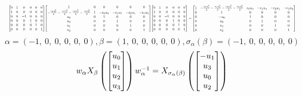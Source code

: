 \documentclass[11pt]{article}
\theoremstyle{definition}
\begin{document}
\[
\scaletoalign{\textwidth}{{\left[\begin{matrix}0 & 1 & 0 & 0 & 0 & 0\\1 & 0 & 0 & 0 & 0 & 0\\0 & 0 & -1 & 0 & 0 & 0\\0 & 0 & 0 & 1 & 0 & 0\\0 & 0 & 0 & 0 & 1 & 0\\0 & 0 & 0 & 0 & 0 & 1\end{matrix}\right]} {\left[\begin{matrix}1 & 0 & 0 & 0 & 0 & 0\\- \frac{c_{0} u_{0}^{2}}{2} - \frac{c_{1} u_{3}^{2}}{2} - \frac{c_{2} u_{1}^{2}}{2} - \frac{c_{3} u_{2}^{2}}{2} & 1 & - c_{0} u_{0} & - c_{1} u_{3} & - c_{2} u_{1} & - c_{3} u_{2}\\u_{0} & 0 & 1 & 0 & 0 & 0\\u_{3} & 0 & 0 & 1 & 0 & 0\\u_{1} & 0 & 0 & 0 & 1 & 0\\u_{2} & 0 & 0 & 0 & 0 & 1\end{matrix}\right]} {\left[\begin{matrix}0 & 1 & 0 & 0 & 0 & 0\\1 & 0 & 0 & 0 & 0 & 0\\0 & 0 & -1 & 0 & 0 & 0\\0 & 0 & 0 & 1 & 0 & 0\\0 & 0 & 0 & 0 & 1 & 0\\0 & 0 & 0 & 0 & 0 & 1\end{matrix}\right]} = {\left[\begin{matrix}1 & - \frac{c_{0} u_{0}^{2}}{2} - \frac{c_{1} u_{3}^{2}}{2} - \frac{c_{2} u_{1}^{2}}{2} - \frac{c_{3} u_{2}^{2}}{2} & c_{0} u_{0} & - c_{1} u_{3} & - c_{2} u_{1} & - c_{3} u_{2}\\0 & 1 & 0 & 0 & 0 & 0\\0 & - u_{0} & 1 & 0 & 0 & 0\\0 & u_{3} & 0 & 1 & 0 & 0\\0 & u_{1} & 0 & 0 & 1 & 0\\0 & u_{2} & 0 & 0 & 0 & 1\end{matrix}\right]}}
\]
\[
\alpha = \left( -1, \  0, \  0, \  0, \  0, \  0\right), \beta = \left( 1, \  0, \  0, \  0, \  0, \  0\right), \sigma_{\alpha}(\beta) = \left( -1, \  0, \  0, \  0, \  0, \  0\right)
\]
\[
\scaletoalign{\textwidth}{w_{\alpha} X_{\beta}\left(\left[\begin{matrix}u_{0}\\u_{1}\\u_{2}\\u_{3}\end{matrix}\right]\right) w_{\alpha}^{-1} = X_{\sigma_{\alpha}\left(\beta\right)}\left(\left[\begin{matrix}- u_{1}\\u_{3}\\u_{0}\\u_{2}\end{matrix}\right]\right)}
\]
\end{document}
